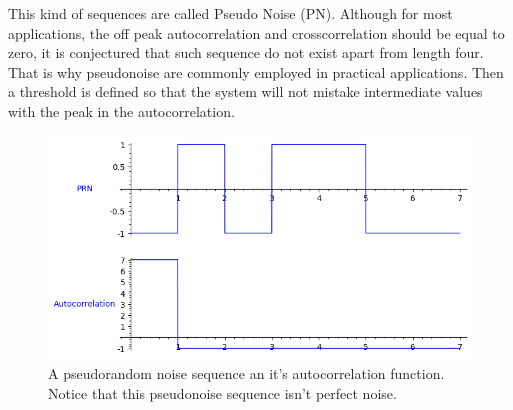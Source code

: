 This kind of sequences are called Pseudo Noise (PN). Although for most
applications, the off peak autocorrelation and crosscorrelation should be equal to
zero, it is conjectured that such sequence do not exist apart from length four. That
is why pseudonoise are commonly employed in practical applications. Then a threshold is defined
so that the system will not mistake intermediate values with the peak in the
autocorrelation.


\begin{figure}[ht!] %
\begin{center}
\includegraphics[width=0.7\linewidth]{Chapters/Introduction/signals_prn}
\end{center}
\caption{A pseudorandom noise sequence an it's autocorrelation function.
Notice that this pseudonoise sequence isn't perfect noise.}
\label{introduction_signals_autocorrelation}
\end{figure}


